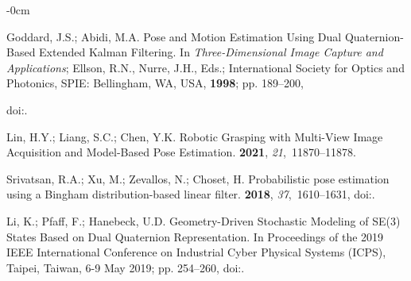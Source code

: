 \documentclass[micromachines,article,accept,pdftex,moreauthors]{Definitions/mdpi}
\begin{document}
\begin{adjustwidth}{-\extralength}{0cm}
\begin{thebibliography}{999}
 Goddard, J.S.; Abidi, M.A.
\newblock Pose and Motion Estimation Using Dual Quaternion-Based Extended Kalman Filtering.
\newblock In \emph{Three-Dimensional Image Capture and Applications}; Ellson, R.N.,
Nurre, J.H., Eds.; International Society for Optics and Photonics, {SPIE: Bellingham, WA, USA,} {\bf 1998}; pp. 189--200,
 
\newblock
doi:{\href{https://doi.org/10.1117/12.302453}{}}.


Lin, H.Y.; Liang, S.C.; Chen, Y.K.
\newblock Robotic Grasping with Multi-View Image Acquisition and Model-Based Pose Estimation.
 {\bf 2021}, {\em 21},~11870--11878.

Srivatsan, R.A.; Xu, M.; Zevallos, N.; Choset, H.
\newblock Probabilistic pose estimation using a Bingham distribution-based linear filter.
 {\bf 2018}, {\em 37},~1610--1631,
\newblock
doi:{\href{https://doi.org/10.1177/0278364918778353}{}}.

Li, K.; Pfaff, F.; Hanebeck, U.D.
\newblock Geometry-Driven Stochastic Modeling of {{SE}}(3) States Based on Dual Quaternion Representation.
\newblock In Proceedings of the 2019 IEEE International Conference on Industrial Cyber Physical Systems {(ICPS), Taipei, Taiwan, 6-9 May 2019;} pp. 254--260,
\newblock
doi:{\href{https://doi.org/10.1109/ICPHYS.2019.8780254}{}}.


\end{thebibliography}
\end{adjustwidth}
\end{document}
